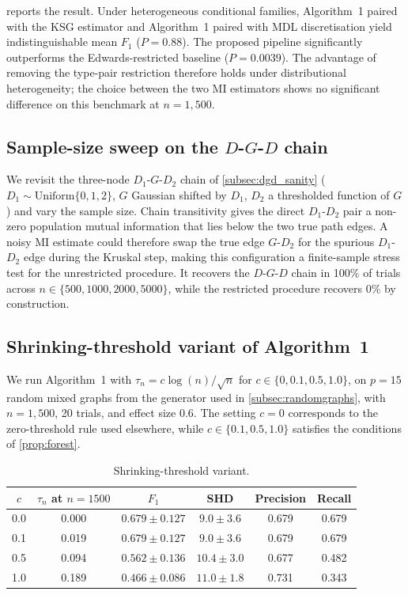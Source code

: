  reports the result. Under heterogeneous
conditional families, Algorithm~1 paired with the KSG estimator and
Algorithm~1 paired with MDL discretisation yield indistinguishable
mean $F_1$ ($P = 0.88$). The proposed pipeline
significantly outperforms the Edwards-restricted baseline
($P = 0.0039$). The advantage of removing the type-pair restriction
therefore holds under distributional heterogeneity; the choice
between the two MI estimators shows no significant difference on
this benchmark at $n = 1{,}500$.

\subsection{Sample-size sweep on the
\texorpdfstring{$D$-$G$-$D$}{D-G-D} chain}
\label{subsec:neartie}

We revisit the three-node $D_1$-$G$-$D_2$ chain of
\cref{subsec:dgd_sanity} ($D_1 \sim \mathrm{Uniform}\{0,1,2\}$, $G$
Gaussian shifted by $D_1$, $D_2$ a thresholded function of $G$) and
vary the sample size. Chain transitivity gives the direct $D_1$-$D_2$ pair a non-zero
population mutual information that lies below the two true path
edges. A noisy MI estimate could therefore swap the true edge
$G$-$D_2$ for the spurious $D_1$-$D_2$ edge during the Kruskal
step, making this configuration a finite-sample stress test for
the unrestricted procedure. It
recovers the $D$-$G$-$D$ chain in 100\% of trials across
$n \in \{500, 1000, 2000, 5000\}$,
while the restricted procedure recovers 0\% by construction.

\subsection{Shrinking-threshold variant of Algorithm~1}
\label{subsec:shrinking}

We run Algorithm~1 with $\tau_n = c \log(n)/\sqrt{n}$ for
$c \in \{0, 0.1, 0.5, 1.0\}$, on $p = 15$ random mixed graphs from the
generator used in \cref{subsec:randomgraphs}, with $n =
1{,}500$, 20 trials, and effect size 0.6. The setting $c = 0$
corresponds to the zero-threshold rule used elsewhere, while
$c \in \{0.1, 0.5, 1.0\}$ satisfies the conditions of
\cref{prop:forest}.

\begin{table}[ht]
\centering
\caption{Shrinking-threshold variant.}
\label{tab:shrinking}
\begin{tabular}{cccccc}
\toprule
$c$ & $\tau_n$ at $n=1500$ & $F_1$ & SHD & Precision & Recall \\
\midrule
0.0 & 0.000 & $0.679 \pm 0.127$ & $9.0 \pm 3.6$ & 0.679 & 0.679 \\
0.1 & 0.019 & $0.679 \pm 0.127$ & $9.0 \pm 3.6$ & 0.679 & 0.679 \\
0.5 & 0.094 & $0.562 \pm 0.136$ & $10.4 \pm 3.0$ & 0.677 & 0.482 \\
1.0 & 0.189 & $0.466 \pm 0.086$ & $11.0 \pm 1.8$ & 0.731 & 0.343 \\
\bottomrule
\end{tabular}
\end{table}

